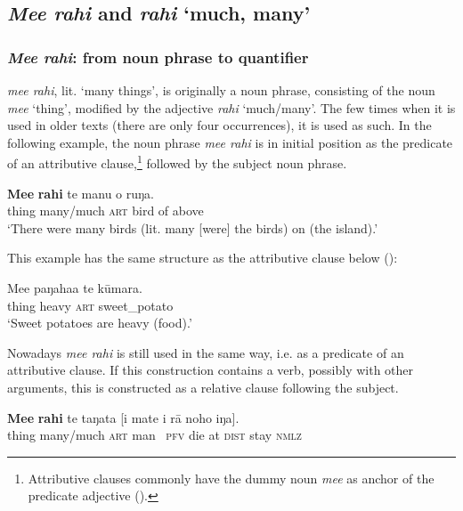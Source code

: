 \subsection{\textit{Me{\ꞌ}e rahi} and \textit{rahi} ‘much, many’}\label{sec:4.4.7}
\subsubsection{\textit{Me{\ꞌ}e rahi}: from noun phrase to quantifier}\label{sec:4.4.7.1}
\textit{me{\ꞌ}e rahi}, lit. ‘many things’, is originally a noun phrase, consisting of the noun \textit{me{\ꞌ}e} ‘thing’, modified by the adjective \textit{rahi} ‘much/many’. The few times when it is used in older texts (there are only four occurrences), it is used as such. In the following example, the noun phrase \textit{me{\ꞌ}e rahi} is in initial position as the predicate of an attributive clause,\footnote{\label{fn:184}Attributive clauses commonly have the dummy noun \textit{me{\ꞌ}e} as anchor of the predicate adjective ().} followed by the subject noun phrase.

\ea\label{ex:4.87}
\gll \textbf{Me{\ꞌ}e} \textbf{rahi} te manu o ruŋa. \\
thing many/much \textsc{art} bird of above \\

\glt
‘There were many birds (lit. many [were] the birds) on (the island).’ \textstyleExampleref{[Egt-02.083]}
\z

This example has the same structure as the attributive clause below ():

\ea\label{ex:4.88}
\gll Me{\ꞌ}e paŋaha{\ꞌ}a te kūmara.\\
thing heavy \textsc{art} sweet\_potato\\

\glt 
‘Sweet potatoes are heavy (food).’ \textstyleExampleref{[Ley-5-24.008]}
\z

Nowadays \textit{me{\ꞌ}e rahi} is still used in the same way, i.e. as a predicate of an attributive clause. If this construction contains a verb, possibly with other arguments, this is constructed as a relative clause following the subject.

\ea\label{ex:4.89}
\gll \textbf{Me{\ꞌ}e} \textbf{rahi} te taŋata [i mate {\ꞌ}i rā noho iŋa]. \\
thing many/much \textsc{art} man \textsc{~pfv} die at \textsc{dist} stay \textsc{nmlz} \\

